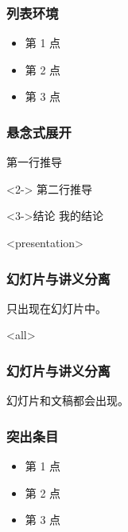 \documentclass{beamer}
\begin{document}
\begin{CJK}{UTF8}{hei}
    \begin{frame}
        \frametitle{列表环境}
        \begin{itemize}[<+->]
            \item 第 1 点
            \item 第 2 点
            \item 第 3 点
        \end{itemize}
    \end{frame}

    \begin{frame}
        \frametitle{悬念式展开}
        第一行推导

        \begin{actionenv}<2->
            第二行推导
        \end{actionenv}

        \begin{block}<3->{结论}
            我的结论
        \end{block}
    \end{frame}

    \begin{frame}<presentation>
        \frametitle{幻灯片与讲义分离}
        只出现在幻灯片中。
    \end{frame}

    \begin{frame}<all>
        \frametitle{幻灯片与讲义分离}
        幻灯片和文稿都会出现。

    \end{frame}

    \begin{frame}
        \frametitle{突出条目}
        \begin{itemize}[<+-| alert@+>]
            \item 第 1 点
            \item 第 2 点
            \item 第 3 点
        \end{itemize}
    \end{frame}

\end{CJK}
\end{document}
